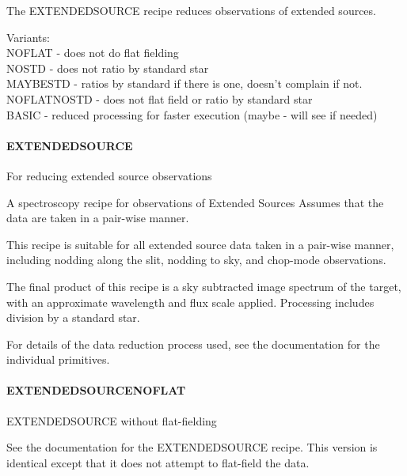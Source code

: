 \documentclass[twoside,11pt]{article}
\renewcommand{\_}{\texttt{\symbol{95}}}
\begin{document}
The EXTENDED\_SOURCE recipe reduces observations of extended sources.

Variants: \\
\_NOFLAT - does not do flat fielding \\
\_NOSTD - does not ratio by standard star \\
\_MAYBESTD - ratios by standard if there is one, doesn't complain if not. \\
\_NOFLAT\_NOSTD - does not flat field or ratio by standard star \\
\_BASIC - reduced processing for faster execution (maybe - will see if needed) \\

\paragraph{EXTENDED\_SOURCE\label{EXTENDED_SOURCE}}

For reducing extended source observations


\mbox{}

A spectroscopy recipe for observations of Extended Sources
Assumes that the data are taken in a pair-wise manner.



This recipe is suitable for all extended source data taken in a pair-wise
manner, including nodding along the slit, nodding to sky, and
chop-mode observations.



The final product of this recipe is a sky subtracted image spectrum of
the target, with an approximate wavelength and flux scale
applied. Processing includes division by a standard star.



For details of the data reduction process used, see the documentation
for the individual primitives.

\paragraph{EXTENDED\_SOURCE\_NOFLAT\label{EXTENDED_SOURCE_NOFLAT}}

EXTENDED\_SOURCE without flat-fielding


\mbox{}

See the documentation for the EXTENDED\_SOURCE recipe. This version is
identical except that it does not attempt to flat-field the data.
\end{document}

